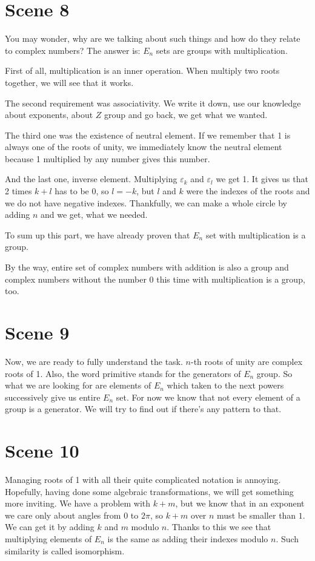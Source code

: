 \documentclass[12pt]{article}
\newcommand{\e}{\varepsilon}
\newcommand{\mybox}[1]{\colorbox{Goldenrod2}{#1}}
\begin{document}
\section*{\mybox{Scene 8}}
    You may wonder, why are we talking about such things and how do they relate to complex numbers? The answer is: $E_n$ sets are groups with multiplication.

    First of all, multiplication is an inner operation. When multiply two roots together, we will see that it works.

    The second requirement was associativity. We write it down, use our knowledge about exponents, about $Z$ group and go back, we get what we wanted.

    The third one was the existence of neutral element. If we remember that 1 is always one of the roots of unity, we immediately know the neutral element because 1 multiplied by any number gives this number.

    And the last one, inverse element. Multiplying $\e_k$ and $\e_l$ we get 1. It gives us that 2 times $k + l$ has to be 0, so $l = -k$, but $l$ and $k$ were the indexes of the roots and we do not have negative indexes. Thankfully, we can make a whole circle by adding $n$ and we get, what we needed.

    To sum up this part, we have already proven that $E_n$ set with multiplication is a group.

    By the way, entire set of complex numbers with addition is also a group and complex numbers without the number 0 this time with multiplication is a group, too.

\section*{\mybox{Scene 9}}
    Now, we are ready to fully understand the task. $n$-th roots of unity are complex roots of 1. Also, the word primitive stands for the generators of $E_n$ group. So what we are looking for are elements of $E_n$ which taken to the next powers successively give us entire $E_n$ set. For now we know that not every element of a group is a generator. We will try to find out if there's any pattern to that.

\section*{\mybox{Scene 10}}
    Managing roots of 1 with all their quite complicated notation is annoying. Hopefully, having done some algebraic transformations, we will get something more inviting. We have a problem with $k+m$, but we know that in an exponent we care only about angles from 0 to $2\pi$, so $k+m$ over $n$ must be smaller than $1$. We can get it by adding $k$ and $m$ modulo $n$. Thanks to this we see that multiplying elements of $E_n$ is the same as adding their indexes modulo $n$. Such similarity is called isomorphism.
\end{document}
